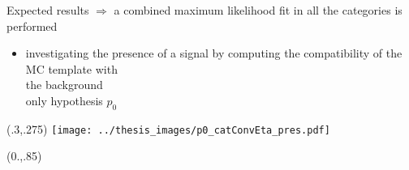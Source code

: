\documentclass[10pt,UKenglish, leqno, xcolor = dvipsnames]{beamer}
\begin{document}
	\begin{frame}{Expected results}
		\vspace{.4cm}
		$\Longrightarrow$ a combined maximum likelihood fit in all the categories is performed
		\begin{itemize}
			\item investigating the presence of a signal by computing the compatibility of the MC template with\\ the background\\ only hypothesis $p_0$
		\end{itemize}	
		\begin{textblock}{1}(.3,.275)	
			\texttt{[image: ../thesis\_images/p0\_catConvEta\_pres.pdf]}\\
		\end{textblock}
		\begin{textblock}{1}(0.,.85)
			\begin{figure}
			\end{figure}
		\end{textblock}
	\end{frame}
	
\end{document}
